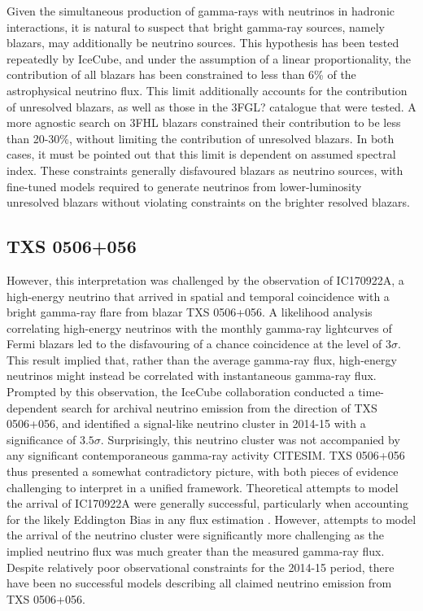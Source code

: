  Given the simultaneous production of gamma-rays with neutrinos in hadronic interactions, it is natural to suspect that bright gamma-ray sources, namely blazars, may additionally be neutrino sources. This hypothesis has been tested repeatedly by IceCube, and under the assumption of a linear proportionality, the contribution of all blazars has been constrained to less than 6\% of the astrophysical neutrino flux. This limit additionally accounts for the contribution of unresolved blazars, as well as those in the 3FGL? catalogue that were tested. A more agnostic search on 3FHL blazars constrained their contribution to be less than 20-30\%, without limiting the contribution of unresolved blazars. In both cases, it must be pointed out that this limit is dependent on assumed spectral index. These constraints generally disfavoured blazars as neutrino sources, with fine-tuned models required to generate neutrinos from lower-luminosity unresolved blazars without violating constraints on the brighter resolved blazars. 
 
 \subsection{TXS 0506+056}
 
 However, this interpretation was challenged by the observation of IC170922A, a high-energy neutrino that arrived in spatial and temporal coincidence with a bright gamma-ray flare from blazar TXS 0506+056. A likelihood analysis correlating high-energy neutrinos with the monthly gamma-ray lightcurves of Fermi blazars led to the disfavouring of a chance coincidence at the level of $3 \sigma$. This result implied that, rather than the average gamma-ray flux, high-energy neutrinos might instead be correlated with instantaneous gamma-ray flux. Prompted by this observation, the IceCube collaboration conducted a time-dependent search for archival neutrino emission from the direction of TXS 0506+056, and identified a signal-like neutrino cluster in 2014-15 with a significance of $3.5 \sigma$. Surprisingly, this neutrino cluster was not accompanied by any significant contemporaneous gamma-ray activity CITESIM. TXS 0506+056 thus presented a somewhat contradictory picture, with both pieces of evidence challenging to interpret in a unified framework. Theoretical attempts to model the arrival of IC170922A were generally successful, particularly when accounting for the likely Eddington Bias in any flux estimation . However, attempts to model the arrival of the neutrino cluster were significantly more challenging as the implied neutrino flux was much greater than the measured gamma-ray flux. Despite relatively poor observational constraints for the 2014-15 period, there have been no successful models describing all claimed neutrino emission from TXS 0506+056.
 

